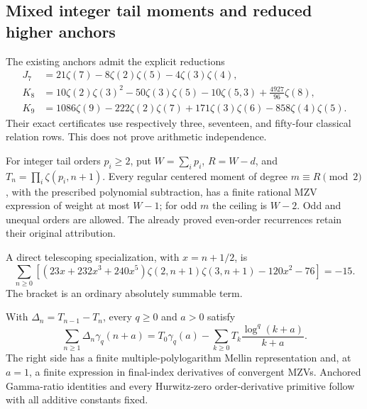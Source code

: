 \subsection{Mixed integer tail moments and reduced higher anchors}
\label{mta:section}
The existing anchors admit the explicit reductions
\begin{align}
 J_7&=21\zeta(7)-8\zeta(2)\zeta(5)-4\zeta(3)\zeta(4),\label{mta:J7}\\
 K_8&=10\zeta(2)\zeta(3)^2-50\zeta(3)\zeta(5)
                 -10\zeta(5,3)+\frac{4927}{96}\zeta(8),\label{mta:K8}\\
 K_9&=1086\zeta(9)-222\zeta(2)\zeta(7)
                  +171\zeta(3)\zeta(6)-858\zeta(4)\zeta(5).
 \label{mta:K9}
\end{align}
Their exact certificates use respectively three, seventeen, and fifty-four
classical relation rows. This does not prove arithmetic independence.

For integer tail orders $p_i\ge2$, put $W=\sum_i p_i$, $R=W-d$,
and $T_n=\prod_i\zeta(p_i,n+1)$. Every regular centered moment
of degree $m\equiv R\pmod2$, with the prescribed polynomial subtraction,
has a finite rational MZV expression of weight at most $W-1$;
for odd $m$ the ceiling is $W-2$. Odd and unequal orders are allowed.
The already proved even-order recurrences retain their original attribution.

A direct telescoping specialization, with $x=n+1/2$, is
\[
 \sum_{n\ge0}\left[(23x+232x^3+240x^5)
 \zeta(2,n+1)\zeta(3,n+1)-120x^2-76\right]=-15.
\]
The bracket is an ordinary absolutely summable term.

With $\Delta_n=T_{n-1}-T_n$, every $q\ge0$ and $a>0$ satisfy
\[
 \sum_{n\ge1}\Delta_n\gamma_q(n+a)
 =T_0\gamma_q(a)-\sum_{k\ge0}T_k\frac{\log^q(k+a)}{k+a}.
\]
The right side has a finite multiple-polylogarithm Mellin representation and,
at $a=1$, a finite expression in final-index derivatives of convergent MZVs.
Anchored Gamma-ratio identities and every Hurwitz-zero order-derivative
primitive follow with all additive constants fixed.
